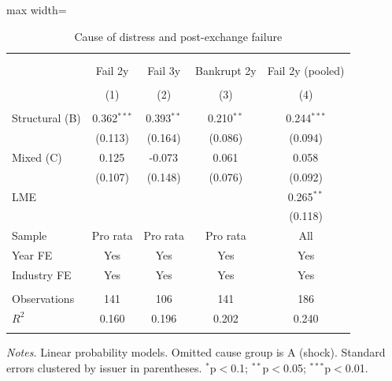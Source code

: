 \begin{table}[!htbp] \centering
  \caption{Cause of distress and post-exchange failure}
\begin{adjustbox}{max width=\textwidth}
\begin{tabular}{@{\extracolsep{5pt}}lcccc}
\\[-1.8ex]\hline
\hline \\[-1.8ex]
\\[-1.8ex] & \multicolumn{1}{c}{Fail 2y} & \multicolumn{1}{c}{Fail 3y} & \multicolumn{1}{c}{Bankrupt 2y} & \multicolumn{1}{c}{Fail 2y (pooled)}  \\
\\[-1.8ex] & (1) & (2) & (3) & (4) \\
\hline \\[-1.8ex]
 Structural (B) & 0.362$^{***}$ & 0.393$^{**}$ & 0.210$^{**}$ & 0.244$^{***}$ \\
& (0.113) & (0.164) & (0.086) & (0.094) \\
 Mixed (C) & 0.125$^{}$ & -0.073$^{}$ & 0.061$^{}$ & 0.058$^{}$ \\
& (0.107) & (0.148) & (0.076) & (0.092) \\
 LME & & & & 0.265$^{**}$ \\
& & & & (0.118) \\
 Sample & Pro rata & Pro rata & Pro rata & All \\
 Year FE & Yes & Yes & Yes & Yes \\
 Industry FE & Yes & Yes & Yes & Yes \\
\hline \\[-1.8ex]
 Observations & 141 & 106 & 141 & 186 \\
 $R^2$ & 0.160 & 0.196 & 0.202 & 0.240 \\
\hline
\hline \\[-1.8ex]
\end{tabular}
\end{adjustbox}
\label{tab:reg_part1}
\begin{minipage}{0.95\textwidth}\vspace{4pt}\footnotesize
\textit{Notes.} Linear probability models. Omitted cause group is A (shock). Standard errors clustered by issuer in parentheses. $^{*}$p$<$0.1; $^{**}$p$<$0.05; $^{***}$p$<$0.01.
\end{minipage}
\end{table}
